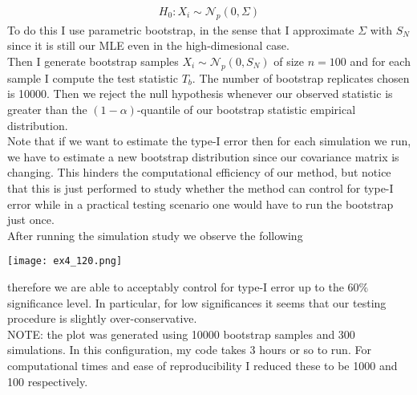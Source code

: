 \documentclass[10pt,notitlepage]{article}
\begin{document}
\begin{exercise}[Solution]
\begin{enumerate}[(a)]
                    \begin{align*}
                        H_0: X_i\sim\mathcal{N}_p(0,\Sigma)
                    \end{align*}
                    To do this I use parametric bootstrap, in the sense that I approximate $\Sigma$ with $S_N$ since it is still our MLE even in the high-dimesional case.\\
                    Then I generate bootstrap samples $X_i\sim\mathcal{N}_p\left(0,S_N\right)$ of size $n=100$ and for each sample I compute the test statistic $T_b$. The number of bootstrap replicates chosen is 10000. Then we reject the null hypothesis whenever our observed statistic is greater than the $(1-\alpha)$-quantile of our bootstrap statistic empirical distribution.\\
                    Note that if we want to estimate the type-I error then for each simulation we run, we have to estimate a new bootstrap distribution since our covariance matrix is changing. This hinders the computational efficiency of our method, but notice that this is just performed to study whether the method can control for type-I error while in a practical testing scenario one would have to run the bootstrap just once.\\
                    After running the simulation study we observe the following
                    \begin{center}
                        \texttt{[image: ex4\_120.png]}
                    \end{center}
                    therefore we are able to acceptably control for type-I error up to the $60\%$ significance level. In particular, for low significances it seems that our testing procedure is slightly over-conservative.\\
                    NOTE: the plot was generated using 10000 bootstrap samples and 300 simulations. In this configuration, my code takes 3 hours or so to run. For computational times and ease of reproducibility I reduced these to be 1000 and 100 respectively.
        \end{enumerate}
    \end{exercise}
\end{document}
